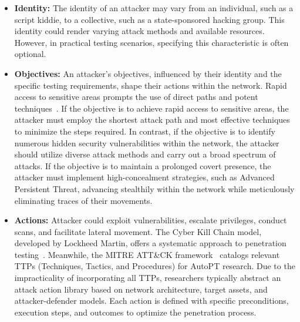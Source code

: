 \begin{itemize}
    \item \textbf{Identity:} The identity of an attacker may vary from an individual, such as a script kiddie, to a collective, such as a state-sponsored hacking group. This identity could render varying attack methods and available resources. 
    However, in practical testing scenarios, specifying this characteristic is often optional.

    \item \textbf{Objectives:} An attacker’s objectives, influenced by their identity and the specific testing requirements, shape their actions within the network.  Rapid access to sensitive areas prompts the use of direct paths and potent techniques~\cite{hu2020automated}.
   If the objective is to achieve rapid access to sensitive areas, the attacker must employ the shortest attack path and most effective techniques to minimize the steps required. In contrast, if the objective is to identify numerous hidden security vulnerabilities within the network, the attacker should utilize diverse attack methods and carry out a broad spectrum of attacks. If the objective is to maintain a prolonged covert presence, the attacker must implement high-concealment strategies, such as Advanced Persistent Threat, advancing stealthily within the network while meticulously eliminating traces of their movements.
    
    \item \textbf{Actions:} Attacker could exploit vulnerabilities, escalate privileges, conduct scans, and facilitate lateral movement. The Cyber Kill Chain model, developed by Lockheed Martin, offers a systematic approach to penetration testing~\cite{hutchins2011intelligence}. Meanwhile, the MITRE ATT\&CK framework~\cite{2018MITRE} catalogs relevant TTPs (Techniques, Tactics, and Procedures) for AutoPT research. 
    Due to the impracticality of incorporating all TTPs, researchers typically abstract an attack action library based on network architecture, target assets, and attacker-defender models. Each action is defined with specific preconditions, execution steps, and outcomes to optimize the penetration process.
    

\end{itemize}
